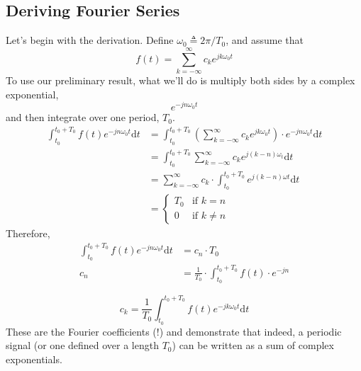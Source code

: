 \documentclass[10pt]{article}
\begin{document}
\subsection*{Deriving Fourier Series}
Let's begin with the derivation.
Define $\omega_0 \triangleq  2\pi/T_0$, and assume that
\[f(t) = \sum_{k = -\infty}^{\infty} c_k e^{jk\omega_0 t}\]
To use our preliminary result, what we'll do is multiply both sides by a complex exponential,
\[e^{-jn\omega_0 t}\]
and then integrate over one period, $T_0$.
\begin{align*}
    \int_{t_0}^{t_0 + T_0} f(t) e^{-jn\omega_0 t} \text{d}t &= \int_{t_0}^{t_0 + T_0} \left(\sum_{k = -\infty}^\infty c_k e^{jk\omega_0 t}\right) \cdot e^{-jn\omega_0 t}\text{d}t\\
    &= \int_{t_0}^{t_0 + T_0} \sum_{k = -\infty}^\infty c_k e^{j(k - n)\omega_t} \text{d}t\\
    &= \sum_{k = -\infty}^\infty c_k \cdot \int_{t_0}^{t_0 + T_0} e^{j(k - n)\omega t}\text{d}t\\
    &= \begin{cases}
    T_0 & \text{if $k = n$} \\ 0 & \text{if $k \neq n$}
    \end{cases}
\end{align*}
Therefore, 
\begin{align*}
    \int_{t_0}^{t_0 + T_0} f(t) e^{-jn\omega_0 t}\text{d}t &= c_n \cdot T_0\\
    c_n &= \frac{1}{T_0} \cdot \int_{t_0}^{t_0 + T_0} f(t) \cdot e^{-jn}
\end{align*}

\[\boxed{c_k = \frac{1}{T_0} \int_{t_0}^{t_0 + T_0} f(t) e^{-jk\omega_0 t} \text{d}t}\]
These are the Fourier coefficients (!) and demonstrate that indeed, a periodic signal (or one defined over a length $T_0$) can be written as a sum of complex exponentials.
\end{document}
